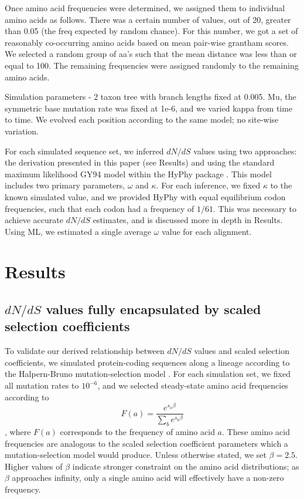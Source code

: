 \documentclass[11pt]{article}
\begin{document}
  
Once amino acid frequencies were determined, we assigned them to individual amino acids as follows. There was a certain number of values, out of 20, greater than 0.05 (the freq expected by random chance). For this number, we got a set of reasonably co-occurring amino acids based on mean pair-wise grantham scores. We selected a random group of aa's such that the mean distance was less than or equal to 100. The remaining frequencies were assigned randomly to the remaining amino acids.

Simulation parameters - 2 taxon tree with branch lengths fixed at 0.005. Mu, the symmetric base mutation rate was fixed at 1e-6, and we varied kappa from time to time. We evolved each position according to the same model; no site-wise variation.

For each simulated sequence set, we inferred $dN/dS$ values using two approaches: the derivation presented in this paper (see Results) and using the standard maximum likelihood GY94 model \cite{GoldmanYang1994} within the HyPhy package \cite{KosakovskyPondetal2005}. This model includes two primary parameters, $\omega$ and $\kappa$. For each inference, we fixed $\kappa$ to the known simulated value, and we provided HyPhy with equal equilibrium codon frequencies, such that each codon had a frequency of $1/61$. This was necessary to achieve accurate $dN/dS$ estimates, and is discussed more in depth in Results. Using ML, we estimated a single average $\omega$ value for each alignment. 



\section*{Results}

\subsection*{$dN/dS$ values fully encapsulated by scaled selection coefficients}

To validate our derived relationship between $dN/dS$ values and scaled selection coefficients, we simulated protein-coding sequences along a lineage according to the Halpern-Bruno mutation-selection model \cite{HalpernBruno1998}. For each simulation set, we fixed all mutation rates to $10^{-6}$, and we selected steady-state amino acid frequencies according to \begin{equation} F(a) = \frac{e^{s_a\beta}}{\sum_b e^{s_b\beta}} \end{equation}, where $F(a)$ corresponds to the frequency of amino acid $a$. These amino acid frequencies are analogous to the scaled selection coefficient parameters which a mutation-selection model would produce. Unless otherwise stated, we set $\beta = 2.5$. Higher values of $\beta$ indicate stronger constraint on the amino acid distributions; as $\beta$ approaches infinity, only a single amino acid will effectively have a non-zero frequency. 
\end{document}
